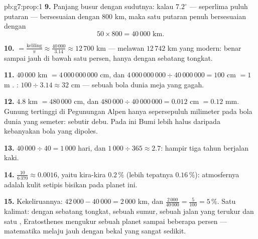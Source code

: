 \begin{solution}{pb:g7:prop:1}
\textbf{9.} Panjang busur  dengan sudutnya: kalau
$7.2^\circ$ --- seperlima puluh putaran --- bersesuaian dengan
$800$ km, maka satu putaran penuh bersesuaian dengan
\[
50 \times 800 = 40\,000 \text{ km}.
\]

\textbf{10.}  $= \frac{\text{keliling}}{\pi}
\approx \frac{40\,000}{3.14} \approx 12\,700$ km --- melawan
$12\,742$ km yang modern: benar sampai jauh di bawah satu persen,
hanya dengan sebatang tongkat.

\textbf{11.} $40\,000$ km $= 4\,000\,000\,000$ cm, dan
$4\,000\,000\,000 \div 40\,000\,000 = 100$ cm $= 1$ m
. : $100 \div 3.14 \approx 32$ cm --- sebuah
bola dunia meja yang gagah.

\textbf{12.} $4.8$ km $= 480\,000$ cm, dan
$480\,000 \div 40\,000\,000 = 0.012$ cm $= 0.12$ mm. Gunung
tertinggi di Pegunungan Alpen hanya sepersepuluh milimeter pada bola
dunia yang  semeter: sebutir debu. Pada  ini Bumi
lebih halus daripada kebanyakan bola yang dipoles.

\textbf{13.} $40\,000 \div 40 = 1\,000$ hari, dan
$1\,000 \div 365 \approx 2.7$: hampir tiga tahun berjalan kaki.

\textbf{14.} $\frac{10}{6\,370} \approx 0.0016$, yaitu kira-kira
$0.2\,\%$ (lebih tepatnya $0.16\,\%$): atmosfernya adalah kulit
setipis bisikan pada planet ini.

\textbf{15.} Kekeliruannya: $42\,000 - 40\,000 = 2\,000$ km, dan
$\frac{2\,000}{40\,000} = \frac{5}{100} = 5\,\%$. Satu kalimat:
dengan sebatang tongkat, sebuah sumur, sebuah jalan yang terukur dan
satu , Eratosthenes mengukur sebuah planet sampai
 beberapa persen --- matematika melaju jauh dengan bekal yang
sangat sedikit.

\end{solution}
